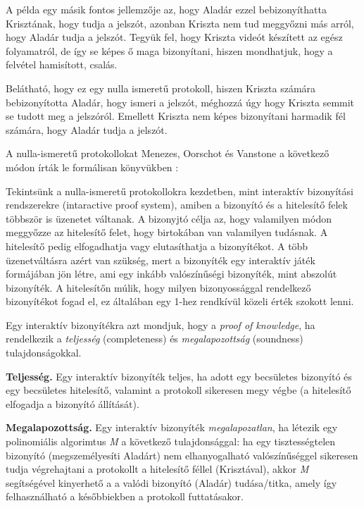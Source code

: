 A példa egy másik fontos jellemzője az, hogy Aladár ezzel bebizonyíthatta Krisztának, hogy tudja a jelszót, azonban Kriszta nem tud meggyőzni más arról, hogy Aladár tudja a jelszót. Tegyük fel, hogy Kriszta videót készített az egész folyamatról, de így se képes ő maga bizonyítani, hiszen mondhatjuk, hogy a felvétel hamisított, csalás.

Belátható, hogy ez egy nulla ismeretű protokoll, hiszen Kriszta számára bebizonyította Aladár, hogy ismeri a jelszót, méghozzá úgy hogy Kriszta semmit se tudott meg a jelszóról. Emellett Kriszta nem képes bizonyítani harmadik fél számára, hogy Aladár tudja a jelszót.

A nulla-ismeretű protokollokat Menezes, Oorschot és Vanstone a következő módon írták le formálisan könyvükben \citeyear{menezes1997handbook}:

Tekintsünk a nulla-ismeretű protokollokra kezdetben, mint interaktív bizonyítási rendszerekre (intaractive proof system), amiben a bizonyító és a hitelesítő felek többször is üzenetet váltanak. A bizonyjtó célja az, hogy valamilyen módon meggyőzze az hitelesítő felet, hogy birtokában van valamilyen tudásnak. A hitelesítő pedig elfogadhatja vagy elutasíthatja a bizonyítékot. A több üzenetváltásra azért van szükség, mert a bizonyíték egy interaktív játék formájában jön létre, ami egy inkább valószínűségi bizonyíték, mint abszolút bizonyíték. A hitelesítőn múlik, hogy milyen bizonyossággal rendelkező bizonyítékot fogad el, ez általában egy 1-hez rendkívül közeli érték szokott lenni.

Egy interaktív bizonyítékra azt mondjuk, hogy a \textit{proof of knowledge}, ha rendelkezik a \textit{teljesség} (completeness) és \textit{megalapozottság} (soundness) tulajdonságokkal.

\begin{definition}
    \textbf{Teljesség.} Egy interaktív bizonyíték teljes, ha adott egy becsületes bizonyító és egy becsületes hitelesítő, valamint a protokoll sikeresen megy végbe (a hitelesítő elfogadja a bizonyító állítását).
\end{definition}

\begin{definition}
    \textbf{Megalapozottság.} Egy interaktív bizonyíték \textit{megalapozatlan}, ha létezik egy polinomiális algorimtus \textit{M} a következő tulajdonsággal: ha egy tisztességtelen bizonyító (megszemélyesíti Aladárt) nem elhanyogalható valószínűséggel sikeresen tudja végrehajtani a protokollt a hitelesítő féllel (Krisztával), akkor \textit{M} segítségével kinyerhető a a valódi bizonyító (Aladár) tudása/titka, amely így felhasználható a későbbiekben a protokoll futtatásakor.
\end{definition}

